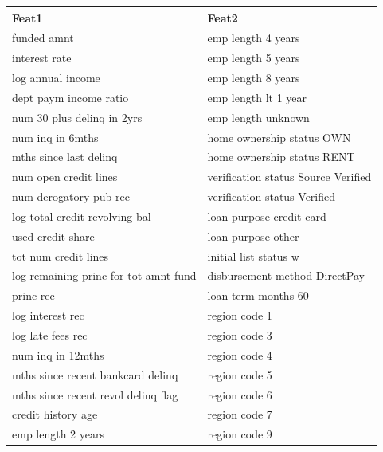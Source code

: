 \begin{tabular}{ll}
\toprule
Feat1 & Feat2 \\
\midrule
funded amnt & emp length 4 years \\
interest rate & emp length 5 years \\
log annual income & emp length 8 years \\
dept paym income ratio & emp length  lt  1 year \\
num 30 plus  delinq in 2yrs & emp length unknown \\
num inq in 6mths & home ownership status OWN \\
mths since last delinq & home ownership status RENT \\
num open credit lines & verification status Source Verified \\
num derogatory pub rec & verification status Verified \\
log total credit revolving bal & loan purpose credit card \\
used credit share & loan purpose other \\
tot num credit lines & initial list status w \\
log remaining princ for tot amnt fund & disbursement method DirectPay \\
princ rec & loan term months 60 \\
log interest rec & region code 1 \\
log late fees rec & region code 3 \\
num inq in 12mths & region code 4 \\
mths since recent bankcard delinq & region code 5 \\
mths since recent revol delinq flag & region code 6 \\
credit history age & region code 7 \\
emp length 2 years & region code 9 \\
\bottomrule
\end{tabular}
